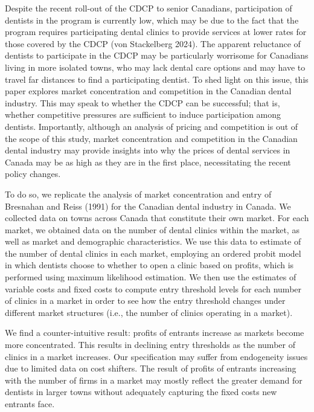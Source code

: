 \documentclass[a4paper,11pt]{article}
\begin{document}
Despite the recent roll-out of the CDCP to senior Canadians, participation of dentists in the program is currently low, which may be due to the fact that the program requires participating dental clinics to provide services at lower rates for those covered by the CDCP (von Stackelberg 2024). The apparent reluctance of dentists to participate in the CDCP may be particularly worrisome for Canadians living in more isolated towns, who may lack dental care options and may have to travel far distances to find a participating dentist. To shed light on this issue, this paper explores market concentration and competition in the Canadian dental industry. This may speak to whether the CDCP can be successful; that is, whether competitive pressures are sufficient to induce participation among dentists. Importantly, although an analysis of pricing and competition is out of the scope of this study, market concentration and competition in the Canadian dental industry may provide insights into why the prices of dental services in Canada may be as high as they are in the first place, necessitating the recent policy changes.

To do so, we replicate the analysis of market concentration and entry of Bresnahan and Reiss (1991) for the Canadian dental industry in Canada. We collected data on towns across Canada that constitute their own market. For each market, we obtained data on the number of dental clinics within the market, as well as market and demographic characteristics. We use this data to estimate of the number of dental clinics in each market, employing an ordered probit model in which dentists choose to whether to open a clinic based on profits, which is performed using maximum likelihood estimation. We then use the estimates of variable costs and fixed costs to compute entry threshold levels for each number of clinics in a market in order to see how the entry threshold changes under different market structures (i.e., the number of clinics operating in a market).

We find a counter-intuitive result: profits of entrants increase as markets become more concentrated. This results in declining entry thresholds as the number of clinics in a market increases. Our specification may suffer from endogeneity issues due to limited data on cost shifters. The result of profits of entrants increasing with the number of firms in a market may mostly reflect the greater demand for dentists in larger towns without adequately capturing the fixed costs new entrants face.
\end{document}
